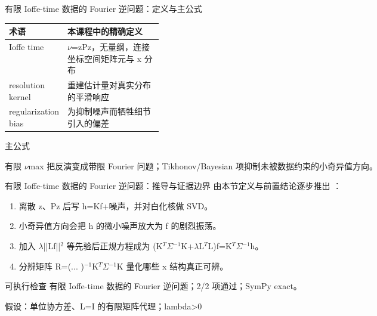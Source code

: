 \begin{frame}[t]{有限 Ioffe-time 数据的 Fourier 逆问题：定义与主公式}
\footnotesize\begin{tabularx}{\linewidth}{p{0.30\linewidth}Y}
\toprule 术语 & 本课程中的精确定义\\\midrule
{} Ioffe time & \ensuremath{\nu}=zPz，无量纲，连接坐标空间矩阵元与 x 分布\\
 resolution kernel & 重建估计量对真实分布的平滑响应\\
 regularization bias & 为抑制噪声而牺牲细节引入的偏差\\
\bottomrule\end{tabularx}\vspace{0.15cm}
\begin{block}{ 主公式}\centering{}\end{block}
有限 \ensuremath{\nu}max 把反演变成带限 Fourier 问题；Tikhonov/\allowbreak{}Bayesian 项抑制未被数据约束的小奇异值方向。
\end{frame}

\begin{frame}[t]{有限 Ioffe-time 数据的 Fourier 逆问题：推导与证据边界}
\footnotesize
{}\quad 由本节定义与前置结论逐步推出 ：
\begin{enumerate}
\item 离散 z、Pz 后写 h=Kf+噪声，并对白化核做 SVD。
\item 小奇异值方向会把 h 的微小噪声放大为 f 的剧烈振荡。
\item 加入 \ensuremath{\lambda}||Lf||\ensuremath{^{2}} 等先验后正规方程成为 (K\ensuremath{^{T}}\ensuremath{\Sigma}\ensuremath{^{-1}}K+\ensuremath{\lambda}L\ensuremath{^{T}}L)f=K\ensuremath{^{T}}\ensuremath{\Sigma}\ensuremath{^{-1}}h。
\item 分辨矩阵 R=(... )\ensuremath{^{-1}}K\ensuremath{^{T}}\ensuremath{\Sigma}\ensuremath{^{-1}}K 量化哪些 x 结构真正可辨。
\end{enumerate}\begin{block}{可执行检查}
\quad 有限 Ioffe-time 数据的 Fourier 逆问题；2/2 项通过；SymPy exact。
\par\scriptsize 假设：单位协方差、L=I 的有限矩阵代理；lambda>0
\end{block}
\end{frame}

